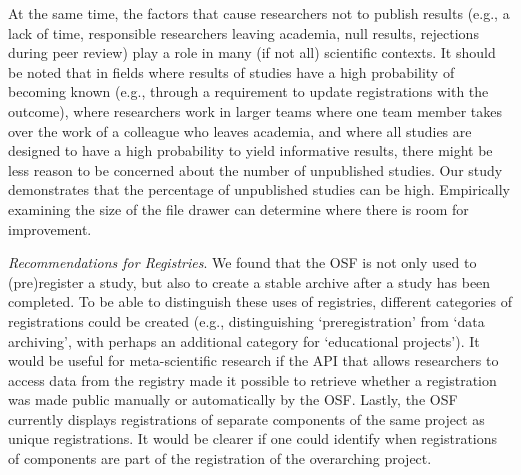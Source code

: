 \documentclass[
  ,jou, a4paper,floatsintext]{apa6}
\begin{document}
At the same time, the factors that cause researchers not to publish results (e.g., a lack of time, responsible researchers leaving academia, null results, rejections during peer review) play a role in many (if not all) scientific contexts. It should be noted that in fields where results of studies have a high probability of becoming known (e.g., through a requirement to update registrations with the outcome), where researchers work in larger teams where one team member takes over the work of a colleague who leaves academia, and where all studies are designed to have a high probability to yield informative results, there might be less reason to be concerned about the number of unpublished studies. Our study demonstrates that the percentage of unpublished studies can be high. Empirically examining the size of the file drawer can determine where there is room for improvement.

\emph{Recommendations for Registries}. We found that the OSF is not only used to (pre)register a study, but also to create a stable archive after a study has been completed. To be able to distinguish these uses of registries, different categories of registrations could be created (e.g., distinguishing `preregistration' from `data archiving', with perhaps an additional category for `educational projects'). It would be useful for meta-scientific research if the API that allows researchers to access data from the registry made it possible to retrieve whether a registration was made public manually or automatically by the OSF. Lastly, the OSF currently displays registrations of separate components of the same project as unique registrations. It would be clearer if one could identify when registrations of components are part of the registration of the overarching project.
\end{document}

